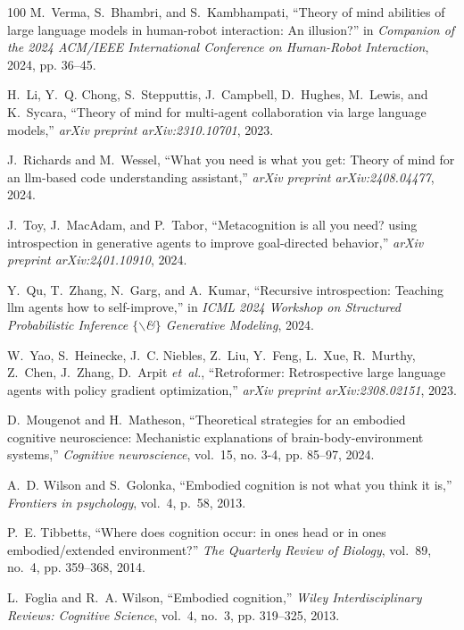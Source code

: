 \documentclass[10pt,journal,compsoc]{IEEEtran}
\begin{document}
\begin{thebibliography}{100}
	M.~Verma, S.~Bhambri, and S.~Kambhampati, ``Theory of mind abilities of large
	language models in human-robot interaction: An illusion?'' in \emph{Companion
		of the 2024 ACM/IEEE International Conference on Human-Robot Interaction},
	2024, pp. 36--45.
	
	H.~Li, Y.~Q. Chong, S.~Stepputtis, J.~Campbell, D.~Hughes, M.~Lewis, and
	K.~Sycara, ``Theory of mind for multi-agent collaboration via large language
	models,'' \emph{arXiv preprint arXiv:2310.10701}, 2023.
	
	J.~Richards and M.~Wessel, ``What you need is what you get: Theory of mind for
	an llm-based code understanding assistant,'' \emph{arXiv preprint
		arXiv:2408.04477}, 2024.
	
	J.~Toy, J.~MacAdam, and P.~Tabor, ``Metacognition is all you need? using
	introspection in generative agents to improve goal-directed behavior,''
	\emph{arXiv preprint arXiv:2401.10910}, 2024.
	
	Y.~Qu, T.~Zhang, N.~Garg, and A.~Kumar, ``Recursive introspection: Teaching llm
	agents how to self-improve,'' in \emph{ICML 2024 Workshop on Structured
		Probabilistic Inference $\{$$\backslash$\&$\}$ Generative Modeling}, 2024.
	
	W.~Yao, S.~Heinecke, J.~C. Niebles, Z.~Liu, Y.~Feng, L.~Xue, R.~Murthy,
	Z.~Chen, J.~Zhang, D.~Arpit \emph{et~al.}, ``Retroformer: Retrospective large
	language agents with policy gradient optimization,'' \emph{arXiv preprint
		arXiv:2308.02151}, 2023.
	
	D.~Mougenot and H.~Matheson, ``Theoretical strategies for an embodied cognitive
	neuroscience: Mechanistic explanations of brain-body-environment systems,''
	\emph{Cognitive neuroscience}, vol.~15, no. 3-4, pp. 85--97, 2024.
	
	A.~D. Wilson and S.~Golonka, ``Embodied cognition is not what you think it
	is,'' \emph{Frontiers in psychology}, vol.~4, p.~58, 2013.
	
	P.~E. Tibbetts, ``Where does cognition occur: in ones head or in ones
	embodied/extended environment?'' \emph{The Quarterly Review of Biology},
	vol.~89, no.~4, pp. 359--368, 2014.
	
	L.~Foglia and R.~A. Wilson, ``Embodied cognition,'' \emph{Wiley
		Interdisciplinary Reviews: Cognitive Science}, vol.~4, no.~3, pp. 319--325,
	2013.
	

\end{thebibliography}
\end{document}
